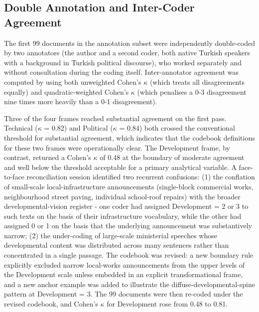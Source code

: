 \documentclass[12pt, journal]{IEEEtran}
\begin{document}
\subsection{Double Annotation and Inter-Coder Agreement}
The first 99 documents in the annotation subset were independently double-coded by two annotators (the author and a second coder, both native Turkish speakers with a background in Turkish political discourse), who worked separately and without consultation during the coding itself. Inter-annotator agreement was computed by using both unweighted Cohen's $\kappa$ (which treats all disagreements equally) and quadratic-weighted Cohen's $\kappa$ (which penalises a 0-3 disagreement nine times more heavily than a 0-1 disagreement).

Three of the four frames reached substantial agreement on the first pass. Technical ($\kappa$ = 0.82) and Political ($\kappa$ = 0.84) both crossed the conventional threshold for substantial agreement, which indicates that the codebook definitions for these two frames were operationally clear. The Development frame, by contrast, returned a Cohen's $\kappa$ of 0.48 at the boundary of moderate agreement and well below the threshold acceptable for a primary analytical variable. A face-to-face reconciliation session identified two recurrent confusions: (1) the conflation of small-scale local-infrastructure announcements (single-block commercial works, neighbourhood street paving, individual school-roof repairs) with the broader developmental-vision register - one coder had assigned Development = 2 or 3 to such texts on the basis of their infrastructure vocabulary, while the other had assigned 0 or 1 on the basis that the underlying announcement was substantively narrow; (2) the under-coding of large-scale ministerial speeches whose developmental content was distributed across many sentences rather than concentrated in a single passage. The codebook was revised: a new boundary rule explicitly excluded narrow local-works announcements from the upper levels of the Development scale unless embedded in an explicit transformational frame, and a new anchor example was added to illustrate the diffuse-developmental-spine pattern at Development = 3. The 99 documents were then re-coded under the revised codebook, and Cohen's $\kappa$ for Development rose from 0.48 to 0.81.
\end{document}
